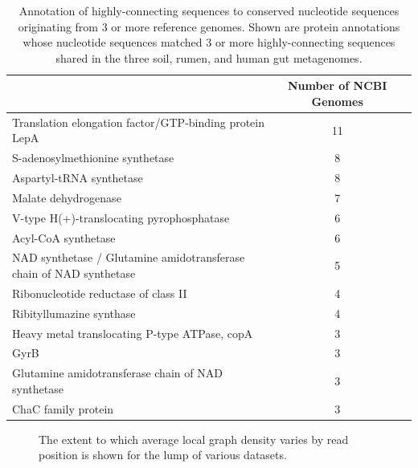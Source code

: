 \documentclass[10pt]{article}
\begin{document}
\begin{table}
\caption{Annotation of highly-connecting sequences to conserved nucleotide sequences originating from 3 or more reference genomes.  Shown are protein annotations whose nucleotide sequences matched 3 or more highly-connecting sequences shared in the three soil, rumen, and human gut metagenomes.}
\begin{tabular}{lc c}
\hline
& Number of NCBI Genomes \\
\hline
Translation elongation factor/GTP-binding protein LepA	&11\\
S-adenosylmethionine synthetase	&8\\
Aspartyl-tRNA synthetase	 &8\\
Malate dehydrogenase	&7\\
V-type H(+)-translocating pyrophosphatase	&6\\
Acyl-CoA synthetase	&6\\
NAD synthetase / Glutamine amidotransferase chain of NAD synthetase	&5\\
Ribonucleotide reductase of class II	&4\\
Ribityllumazine synthase	&4\\
Heavy metal translocating P-type ATPase, copA	&3\\
GyrB	 &3\\
Glutamine amidotransferase chain of NAD synthetase	&3\\
ChaC family protein	&3\\
\end{tabular}
\end{table}

\begin{figure}
\caption{The extent to which average local graph density varies by read position is shown for the lump of various datasets.}
\end{figure}
\end{document}
